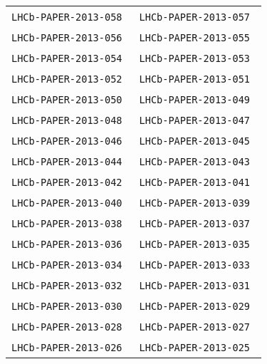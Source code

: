 \begin{center}
\begin{longtable}{ll}
\texttt{LHCb-PAPER-2013-058}~\cite{LHCb-PAPER-2013-058} &
\texttt{LHCb-PAPER-2013-057}~\cite{LHCb-PAPER-2013-057} \\
\texttt{LHCb-PAPER-2013-056}~\cite{LHCb-PAPER-2013-056} &
\texttt{LHCb-PAPER-2013-055}~\cite{LHCb-PAPER-2013-055} \\
\texttt{LHCb-PAPER-2013-054}~\cite{LHCb-PAPER-2013-054} &
\texttt{LHCb-PAPER-2013-053}~\cite{LHCb-PAPER-2013-053} \\
\texttt{LHCb-PAPER-2013-052}~\cite{LHCb-PAPER-2013-052} &
\texttt{LHCb-PAPER-2013-051}~\cite{LHCb-PAPER-2013-051} \\
\texttt{LHCb-PAPER-2013-050}~\cite{LHCb-PAPER-2013-050} &
\texttt{LHCb-PAPER-2013-049}~\cite{LHCb-PAPER-2013-049} \\
\texttt{LHCb-PAPER-2013-048}~\cite{LHCb-PAPER-2013-048} &
\texttt{LHCb-PAPER-2013-047}~\cite{LHCb-PAPER-2013-047} \\
\texttt{LHCb-PAPER-2013-046}~\cite{LHCb-PAPER-2013-046} &
\texttt{LHCb-PAPER-2013-045}~\cite{LHCb-PAPER-2013-045} \\
\texttt{LHCb-PAPER-2013-044}~\cite{LHCb-PAPER-2013-044} &
\texttt{LHCb-PAPER-2013-043}~\cite{LHCb-PAPER-2013-043} \\
\texttt{LHCb-PAPER-2013-042}~\cite{LHCb-PAPER-2013-042} &
\texttt{LHCb-PAPER-2013-041}~\cite{LHCb-PAPER-2013-041} \\
\texttt{LHCb-PAPER-2013-040}~\cite{LHCb-PAPER-2013-040} &
\texttt{LHCb-PAPER-2013-039}~\cite{LHCb-PAPER-2013-039} \\
\texttt{LHCb-PAPER-2013-038}~\cite{LHCb-PAPER-2013-038} &
\texttt{LHCb-PAPER-2013-037}~\cite{LHCb-PAPER-2013-037} \\
\texttt{LHCb-PAPER-2013-036}~\cite{LHCb-PAPER-2013-036} &
\texttt{LHCb-PAPER-2013-035}~\cite{LHCb-PAPER-2013-035} \\
\texttt{LHCb-PAPER-2013-034}~\cite{LHCb-PAPER-2013-034} &
\texttt{LHCb-PAPER-2013-033}~\cite{LHCb-PAPER-2013-033} \\
\texttt{LHCb-PAPER-2013-032}~\cite{LHCb-PAPER-2013-032} &
\texttt{LHCb-PAPER-2013-031}~\cite{LHCb-PAPER-2013-031} \\
\texttt{LHCb-PAPER-2013-030}~\cite{LHCb-PAPER-2013-030} &
\texttt{LHCb-PAPER-2013-029}~\cite{LHCb-PAPER-2013-029} \\
\texttt{LHCb-PAPER-2013-028}~\cite{LHCb-PAPER-2013-028} &
\texttt{LHCb-PAPER-2013-027}~\cite{LHCb-PAPER-2013-027} \\
\texttt{LHCb-PAPER-2013-026}~\cite{LHCb-PAPER-2013-026} &
\texttt{LHCb-PAPER-2013-025}~\cite{LHCb-PAPER-2013-025} \\

\end{longtable}
\end{center}
